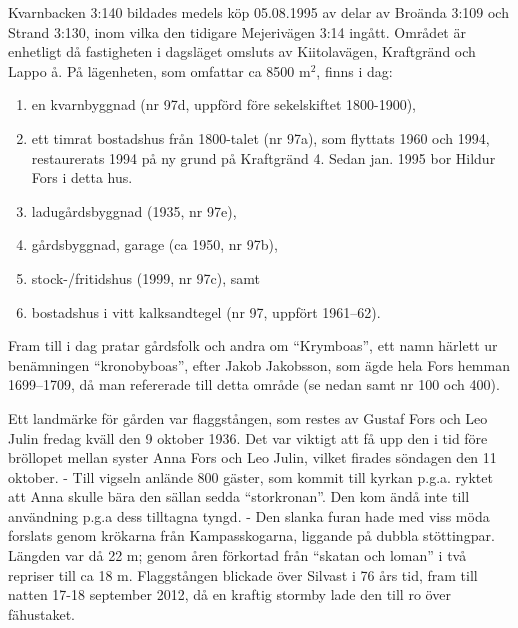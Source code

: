 Kvarnbacken 3:140 bildades medels köp 05.08.1995 av delar av Broända 3:109 och Strand 3:130, inom vilka den tidigare Mejerivägen 3:14 ingått. Området är enhetligt då fastigheten i dagsläget omsluts av Kiitolavägen, Kraftgränd och Lappo å. På lägenheten, som omfattar ca 8500 m$^2$, finns i dag:
\begin{enumerate}
  \item en kvarnbyggnad (nr 97d, uppförd före sekelskiftet 1800-1900),
  \item ett timrat bostadshus från 1800-talet (nr 97a), som flyttats 1960 och 1994, restaurerats 1994 på ny grund på Kraftgränd 4. Sedan jan. 1995 bor Hildur Fors i detta hus.
  \item ladugårdsbyggnad (1935, nr 97e),
  \item gårdsbyggnad, garage (ca 1950, nr 97b),
  \item stock-/fritidshus (1999, nr 97c), samt
  \item bostadshus i vitt kalksandtegel (nr 97, uppfört 1961--62).
\end{enumerate}



Fram till i dag pratar gårdsfolk och andra om ``Krymboas'', ett namn härlett ur benämningen ``kronobyboas'', efter Jakob Jakobsson, som ägde hela Fors hemman 1699--1709, då man refererade till detta område (se nedan samt nr 100 och 400).

Ett landmärke för gården var flaggstången, som restes av Gustaf	Fors och Leo Julin fredag kväll den 9 oktober 1936. Det var viktigt att få upp den i tid före bröllopet mellan syster Anna Fors och Leo Julin, vilket firades söndagen den 11 oktober. - Till vigseln anlände 800	gäster, som kommit till kyrkan p.g.a. ryktet att Anna skulle bära den sällan sedda ``storkronan''. Den kom ändå inte till användning p.g.a	dess tilltagna tyngd. - Den slanka furan hade med viss möda forslats genom	krökarna från Kampasskogarna, liggande på dubbla stöttingpar. Längden var då 22 m; genom åren förkortad från ``skatan och loman''  i två	repriser till ca 18 m. Flaggstången blickade över Silvast i 76 års tid, fram till natten 17-18 september 2012, då en kraftig stormby lade den till ro över fähustaket.


